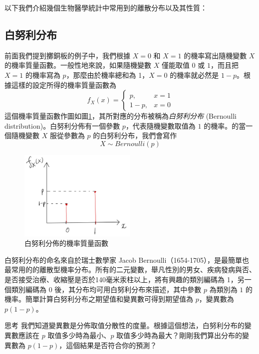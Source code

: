     以下我們介紹幾個生物醫學統計中常用到的離散分布以及其性質：

\subsection{白努利分布}

    前面我們提到擲銅板的例子中，我們根據 $X=0$ 和 $X=1$ 的機率寫出隨機變數 $X$ 的機率質量函數。一般性地來說，如果隨機變數 $X$ 僅能取值 $0$ 或 $1$，而且把 $X=1$ 的機率寫為 $p$，那麼由於機率總和為 1，$X=0$ 的機率就必然是 $1-p$。根據這樣的設定所得的機率質量函數為
    \[f_X(x) = \left\{\begin{array}{rl}
        p, & x = 1\\
        1-p, & x = 0
    \end{array}\right.\]
    這個機率質量函數作圖如圖\ref{fig:bernoulli}，其所對應的分布被稱為\textit{白努利分布} (Bernoulli distribution)。白努利分佈有一個參數 $p$，代表隨機變數取值為 $1$ 的機率。的當一個隨機變數 $X$ 服從參數為 $p$ 的白努利分布，我們會寫作
    \[X \sim Bernoulli(p)\]

    \begin{figure}[htbp]
      \centering
      \includegraphics[width=0.5\textwidth]{figures/03-Probability_distribution/Bernoulli.jpeg}
      \caption{白努利分佈的機率質量函數}
      \label{fig:bernoulli}
    \end{figure}
    
    白努利分布的命名來自於瑞士數學家 Jacob Bernoulli（1654-1705），是最簡單也最常用的的離散型機率分布。所有的二元變數，舉凡性別的男女、疾病發病與否、是否接受治療、收縮壓是否於140毫米汞柱以上，將有興趣的類別編碼為 1，另一個類別編碼為 0 後，其分布均可用白努利分布來描述，其中參數 $p$ 為類別為 $1$ 的機率。簡單計算白努利分布之期望值和變異數可得到期望值為 $p$，變異數為 $p(1-p)$。

    \begin{custom}{思考}
        我們知道變異數是分佈取值分散性的度量。根據這個想法，白努利分布的變異數應該在 $p$ 取值多少時為最小、$p$ 取值多少時為最大？剛剛我們算出分布的變異數為 $p(1-p)$，這個結果是否符合你的預測？
    \end{custom}

